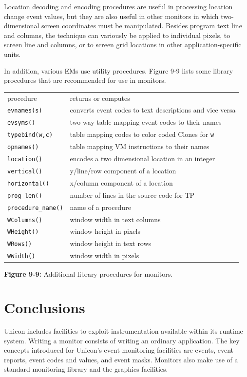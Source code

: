 Location decoding and encoding procedures are useful in processing 
location change event values, but they are also useful in other monitors
in which two-dimensional screen coordinates must be manipulated.
Besides program text line and columns, the technique can variously be
applied to individual pixels, to screen line and columns, or to screen
grid locations in other application-specific units.

In addition, various EMs use utility procedures.  Figure 9-9 lists some
library procedures that are recommended for use in monitors.

\begin{center}
\medskip

\begin{tabular}{|ll|} \hline
procedure  & returns or computes \\
{\tt evnames(s)} & converts event codes to text descriptions and vice versa\\
{\tt evsyms()} & two-way table mapping event codes to their names \\
{\tt typebind(w,c)} & table mapping codes to color coded Clones for {\tt w}\\
{\tt opnames()} & table mapping VM instructions to their names \\
{\tt location()} & encodes a two dimensional location in an integer \\
{\tt vertical()} & y/line/row component of a location \\
{\tt horizontal()} & x/column component of a location \\
{\tt prog\_len()} & number of lines in the source code for TP \\
{\tt procedure\_name()} & name of a procedure \\
{\tt WColumns()} & window width in text columns \\
{\tt WHeight()} & window height in pixels \\
{\tt WRows()} & window height in text rows \\
{\tt WWidth()} & window width in pixels \\
\hline
\end{tabular}

\end{center}
{\sffamily\bfseries Figure 9-9:}
{\sffamily Additional library procedures for monitors.}


\section{Conclusions}

Unicon includes facilities to exploit instrumentation available within its
runtime system.  Writing a monitor consists of writing an ordinary
application.  The key concepts introduced for Unicon's event monitoring
facilities are events, event reports, event codes and values, and event
masks.  Monitors also make use of a standard monitoring library and the
graphics facilities.
